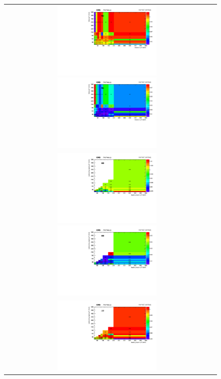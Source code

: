 \begin{figure}[h]
  \begin{center}
    \begin{tabular}{cc}
      \includegraphics[width=0.50\textwidth]{fig_2016preVFP_TrigSF/h2D_lepABpt_emu.pdf}
      \includegraphics[width=0.50\textwidth]{fig_2016preVFP_TrigSF/h2D_lepABpt_emu_BinErrors.pdf}\\       
      \includegraphics[width=0.50\textwidth]{fig_2016preVFP_TrigSF/h2D_lepABpt_ee.pdf}
      \includegraphics[width=0.50\textwidth]{fig_2016preVFP_TrigSF/h2D_lepABpt_ee_BinErrors.pdf}\\
      \includegraphics[width=0.50\textwidth]{fig_2016preVFP_TrigSF/h2D_lepABpt_mumu.pdf}

\end{tabular}
\end{center}
\end{figure}

